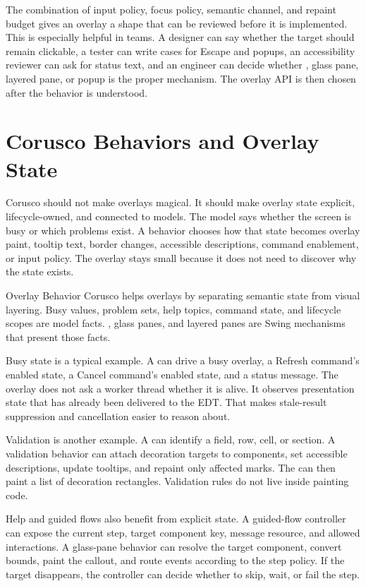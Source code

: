 The combination of input policy, focus policy, semantic channel, and repaint
budget gives an overlay a shape that can be reviewed before it is implemented.
This is especially helpful in teams. A designer can say whether the target
should remain clickable, a tester can write cases for Escape and popups, an
accessibility reviewer can ask for status text, and an engineer can decide
whether , glass pane, layered pane, or popup is the proper
mechanism. The overlay API is then chosen after the behavior is understood.

\section{Corusco Behaviors and Overlay State}

Corusco should not make overlays magical. It should make overlay state explicit, lifecycle-owned, and connected to models. The model says whether the screen is busy or which problems exist. A behavior chooses how that state becomes overlay paint, tooltip text, border changes, accessible descriptions, command enablement, or input policy. The overlay stays small because it does not need to discover why the state exists.

\begin{coruscobox}{Overlay Behavior}
Corusco helps overlays by separating semantic state from visual layering. Busy values, problem sets, help topics, command state, and lifecycle scopes are model facts. , glass panes, and layered panes are Swing mechanisms that present those facts.
\end{coruscobox}

Busy state is a typical example. A  can drive a busy overlay, a Refresh command's enabled state, a Cancel command's enabled state, and a status message. The overlay does not ask a worker thread whether it is alive. It observes presentation state that has already been delivered to the EDT. That makes stale-result suppression and cancellation easier to reason about.

Validation is another example. A  can identify a field, row, cell, or section. A validation behavior can attach decoration targets to components, set accessible descriptions, update tooltips, and repaint only affected marks. The  can then paint a list of decoration rectangles. Validation rules do not live inside painting code.

Help and guided flows also benefit from explicit state. A guided-flow controller can expose the current step, target component key, message resource, and allowed interactions. A glass-pane behavior can resolve the target component, convert bounds, paint the callout, and route events according to the step policy. If the target disappears, the controller can decide whether to skip, wait, or fail the step.

